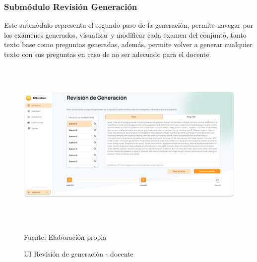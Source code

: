 \documentclass[../Main.tex]{subfiles}
\begin{document}
    \subsubsection{Submódulo Revisión Generación}
    \begin{justify}
    Este submódulo representa el segundo paso de la generación, permite navegar por los exámenes generados, visualizar y modificar cada examen del conjunto, tanto texto base como preguntas generadas, además, permite volver a generar cualquier texto con sus preguntas en caso de no ser adecuado para el docente.
    \end{justify}
    
    \begin{figure}[H]
	\begin{Center}
		\includegraphics[width=6.4in,height=3.3in]{Images/ui_docente_revision_generacion.png}
	    \caption{UI Revisión de generación - docente}
	    Fuente: Elaboración propia
        \label{fig:section}
	\end{Center}
    \end{figure}
    
\end{document}
